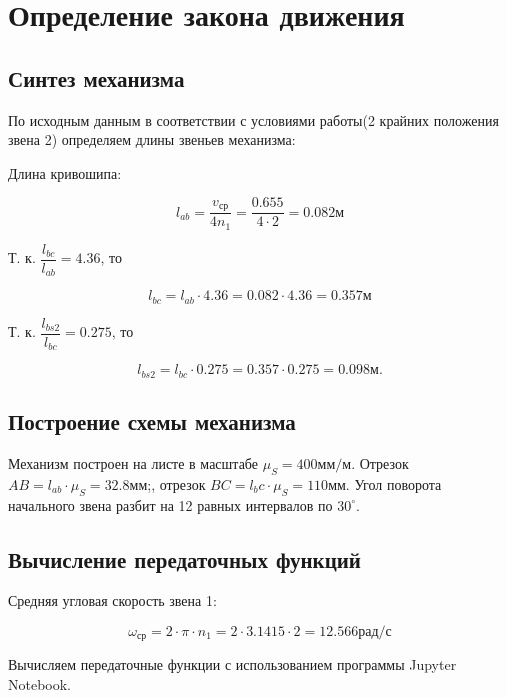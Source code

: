 \section{Определение закона движения}

\subsection{Синтез механизма}

По исходным данным в соответствии с условиями работы(2 крайних положения звена 2) определяем длины звеньев механизма:

Длина кривошипа:

\begin{equation}
	l_{ab} = \dfrac{v_{ср}}{4n_1} = \dfrac{0.655}{4 \cdot 2} = 0.082 м
\end{equation}

	Т. к. $\dfrac{l_{bc}}{l_{ab}} = 4.36$, то

\begin{equation}
	l_{bc} = l_{ab} \cdot 4.36 = 0.082 \cdot 4.36 = 0.357 м
\end{equation}

	Т. к. $\dfrac{l_{bs2}}{l_{bc}} = 0.275$, то

\begin{equation}
	l_{bs2} = l_{bc} \cdot 0.275 = 0.357 \cdot 0.275 = 0.098 м.
\end{equation}

\subsection{Построение схемы механизма}

Механизм построен на листе в масштабе $\mu_S = 400 мм/м$. Отрезок $AB = l_{ab} \cdot \mu_S = 32.8 мм$;, отрезок $BC = l_bc \cdot \mu_S = 110 мм$. Угол поворота начального звена разбит на 12 равных интервалов по $30^{\circ}$. 

\subsection{Вычисление передаточных функций}

Средняя угловая скорость звена 1:

\begin{equation}
	\omega_{ср} = 2 \cdot \pi \cdot n_1 = 2 \cdot 3.1415 \cdot 2 = 12.566 рад/с
\end{equation}

Вычисляем передаточные функции с использованием программы Jupyter Notebook.

